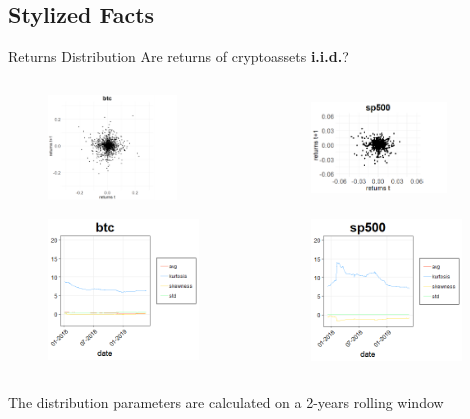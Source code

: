 \documentclass[aspectratio=169]{beamer}
\begin{document}
\subsection{Stylized Facts}
\begin{frame}{Returns Distribution}
Are returns of cryptoassets \textbf{i.i.d.}?
	\begin{columns}
		\begin{column}{0.5\textwidth}
		\begin{figure}
			\includegraphics[width=3.4cm]{Images/lagbtc}
		\end{figure}
		\begin{figure}
			\includegraphics[width=4cm]{Images/btc _lag1d_200.png}
		\end{figure}
		\end{column}
		\begin{column}{0.5\textwidth}  %
		\begin{figure}
			\includegraphics[width=3.6cm, height=2.8cm]{Images/lagsp500}
		\end{figure}
		\begin{figure}
			\includegraphics[width=4cm]{Images/sp500 _lag1d_200}
		\end{figure}
		\end{column}
	\end{columns}
	The distribution parameters are calculated on a 2-years rolling window
\end{frame}
\end{document}
